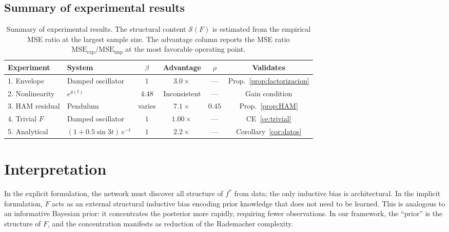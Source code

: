 \documentclass[12pt]{article}
\begin{document}
\subsection{Summary of experimental results}

\begin{table}[ht]
  \centering
  \caption{Summary of experimental results.
    The structural content $\mathcal{S}(F)$ is estimated from the
    empirical MSE ratio at the largest sample size.
    The advantage column reports the MSE ratio
    $\mathrm{MSE}_{\mathrm{exp}}/\mathrm{MSE}_{\mathrm{imp}}$
    at the most favorable operating point.}
  \label{tab:summary}
  \small
  \begin{tabular}{llcccc}
    \toprule
    Experiment & System & $\beta$ & Advantage & $\rho$ & Validates \\
    \midrule
    1. Envelope & Damped oscillator & $1$ & $3.0\times$ &
      --- & Prop.~\ref{prop:factorizacion} \\
    2. Nonlinearity & $e^{g(t)}$ & $4.48$ & Inconsistent &
      --- & Gain condition \\
    3. HAM residual & Pendulum & varies & $7.1\times$ &
      $0.45$ & Prop.~\ref{prop:HAM} \\
    4. Trivial $F$ & Damped oscillator & $1$ & $1.00\times$ &
      --- & CE~\ref{ce:trivial} \\
    5. Analytical & $(1{+}0.5\sin 3t)\,e^{-t}$ & $1$ & $2.2\times$ &
      --- & Corollary~\ref{cor:datos} \\
    \bottomrule
  \end{tabular}
\end{table}

\section{Interpretation}
\label{sec:bias}

In the explicit formulation, the network must discover all structure
of $f^*$ from data; the only inductive bias is architectural.
In the implicit formulation, $F$ acts as an external structural
inductive bias encoding prior knowledge that does not need to be
learned.
This is analogous to an informative Bayesian prior: it concentrates
the posterior more rapidly, requiring fewer observations.
In our framework, the ``prior'' is the structure of $F$, and the
concentration manifests as reduction of the Rademacher complexity.
\end{document}

